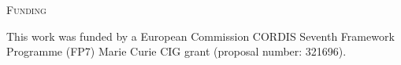 \documentclass[12pt,letterpaper]{article}
\renewcommand{\section}[1]{%
\bigskip
\begin{center}
\begin{Large}
\normalfont\scshape #1
\medskip
\end{Large}
\end{center}}
\renewcommand{\subsection}[1]{%
\bigskip
\begin{center}
\begin{large}
\normalfont\itshape #1
\end{large}
\end{center}}
\begin{document}
\section{Funding} %
This work was funded by a European Commission CORDIS Seventh Framework Programme (FP7) Marie Curie CIG grant (proposal number: 321696).






\end{document}
